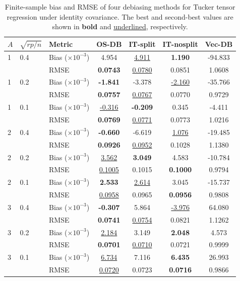 \begin{table}[!htbp]
\centering
\caption{Finite-sample bias and RMSE of four debiasing methods for Tucker tensor regression under identity covariance. The best and second-best values are shown in \textbf{bold} and \underline{underlined}, respectively.}
\label{tab:tsr-methods-ind}
\begin{threeparttable}
\setlength{\tabcolsep}{4pt}
\begin{tabular}{lllcccc}
\toprule
$A$ & $\sqrt{rp/n}$ & Metric & OS-DB & IT-split & IT-nosplit & Vec-DB \\
\midrule
1 & 0.4 & Bias ($\times 10^{-3}$) & 4.954 & \underline{4.911} & \textbf{1.190} & -94.833 \\
 &  & RMSE & \textbf{0.0743} & \underline{0.0780} & 0.0851 & 1.0608 \\
1 & 0.2 & Bias ($\times 10^{-3}$) & \textbf{-1.841} & -3.378 & \underline{-2.160} & -35.766 \\
 &  & RMSE & \textbf{0.0757} & \underline{0.0767} & 0.0770 & 0.9729 \\
1 & 0.1 & Bias ($\times 10^{-3}$) & \underline{-0.316} & \textbf{-0.209} & 0.345 & -4.411 \\
 &  & RMSE & \textbf{0.0769} & \underline{0.0771} & 0.0773 & 1.0216 \\
\midrule
2 & 0.4 & Bias ($\times 10^{-3}$) & \textbf{-0.660} & -6.619 & \underline{1.076} & -19.485 \\
 &  & RMSE & \textbf{0.0926} & \underline{0.0952} & 0.1028 & 1.1380 \\
2 & 0.2 & Bias ($\times 10^{-3}$) & \underline{3.562} & \textbf{3.049} & 4.583 & -10.784 \\
 &  & RMSE & \underline{0.1005} & 0.1015 & \textbf{0.1000} & 0.9794 \\
2 & 0.1 & Bias ($\times 10^{-3}$) & \textbf{2.533} & \underline{2.614} & 3.045 & -15.737 \\
 &  & RMSE & \underline{0.0958} & 0.0965 & \textbf{0.0956} & 0.9808 \\
\midrule
3 & 0.4 & Bias ($\times 10^{-3}$) & \textbf{-0.307} & 5.864 & \underline{-3.976} & 64.080 \\
 &  & RMSE & \textbf{0.0741} & \underline{0.0754} & 0.0821 & 1.1262 \\
3 & 0.2 & Bias ($\times 10^{-3}$) & \underline{2.184} & 3.149 & \textbf{2.048} & 4.573 \\
 &  & RMSE & \textbf{0.0701} & \underline{0.0710} & 0.0721 & 0.9999 \\
3 & 0.1 & Bias ($\times 10^{-3}$) & \underline{6.734} & 7.116 & \textbf{6.435} & 26.993 \\
 &  & RMSE & \underline{0.0720} & 0.0723 & \textbf{0.0716} & 0.9866 \\
\bottomrule
\end{tabular}
\end{threeparttable}
\end{table}
